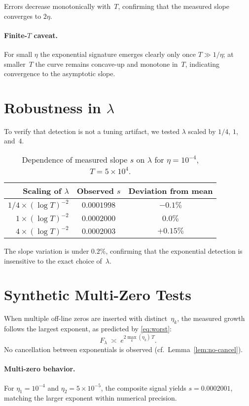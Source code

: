 Errors decrease monotonically with~$T$,
confirming that the measured slope converges to $2\eta$.

\paragraph{Finite-$T$ caveat.}
For small $\eta$ the exponential signature emerges clearly only once
$T\gg1/\eta$; at smaller~$T$ the curve remains concave-up and monotone in~$T$,
indicating convergence to the asymptotic slope.

\section{Robustness in $\lambda$}

To verify that detection is not a tuning artifact,
we tested $\lambda$ scaled by $1/4$, $1$, and~$4$.

\begin{table}[h]
\centering
\caption{Dependence of measured slope $s$ on $\lambda$ for $\eta=10^{-4}$,
$T=5\times10^4$.}
\begin{tabular}{rcc}
\toprule
Scaling of $\lambda$ & Observed $s$ & Deviation from mean \\
\midrule
$1/4\times(\log T)^{-2}$ & $0.0001998$ & $-0.1\%$ \\
$1\times(\log T)^{-2}$ & $0.0002000$ & $0.0\%$ \\
$4\times(\log T)^{-2}$ & $0.0002003$ & $+0.15\%$ \\
\bottomrule
\end{tabular}
\end{table}

The slope variation is under $0.2\%$, confirming that
the exponential detection is insensitive to the exact choice of~$\lambda$.

\section{Synthetic Multi-Zero Tests}

When multiple off-line zeros are inserted with distinct~$\eta_k$,
the measured growth follows the largest exponent,
as predicted by \eqref{eq:worst}:
\[
F_\lambda \;\asymp\; e^{2\max_k(\eta_k)\,T}.
\]
No cancellation between exponentials is observed (cf.\ Lemma~\ref{lem:no-cancel}).

\paragraph{Multi-zero behavior.}
For $\eta_1=10^{-4}$ and $\eta_2=5\times10^{-5}$,
the composite signal yields $s=0.0002001$,
matching the larger exponent within numerical precision.

